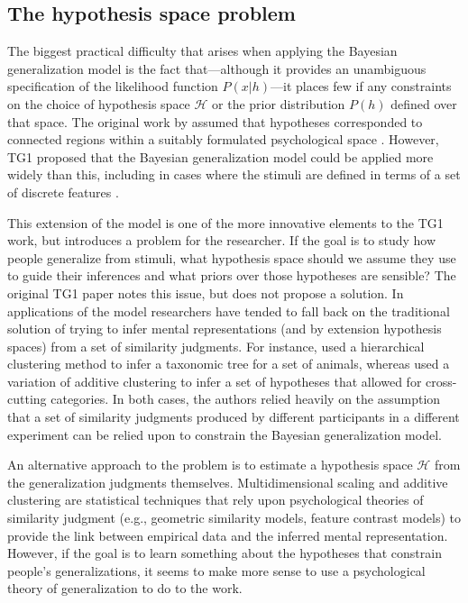 \subsection{The hypothesis space problem}

The biggest practical difficulty that arises when applying the Bayesian generalization model is the fact that---although it provides an unambiguous specification of the likelihood function $P(x|h)$---it places few if any constraints on the choice of hypothesis space $\mathcal{H}$ or the prior distribution $P(h)$ defined over that space. The original work by  assumed that hypotheses corresponded to connected regions within a suitably formulated psychological space \cite<and estimated by multidimensional scaling or similar methods:>{torgerson_theory_1958,borg_modern_2005}. However, TG1 proposed that the Bayesian generalization model could be applied more widely than this, including in cases where the stimuli are defined in terms of a set of discrete features \cite<estimated using additive clustering or similar methods: >{shepard_additive_1979,lee_generating_2002,navarro2008}.

This extension of the model is one of the more innovative elements to the TG1 work, but introduces a problem for the researcher. If the goal is to study how people generalize from stimuli, what hypothesis space should we assume they use to guide their inferences and what priors over those hypotheses are sensible? The original TG1 paper notes this issue, but does not propose a solution. In applications of the model researchers have tended to fall back on the traditional solution of trying to infer mental representations (and by extension hypothesis spaces) from a set of similarity judgments. For instance,  used a hierarchical clustering method to infer a taxonomic tree for a set of animals, whereas  used a variation of additive clustering to infer a set of hypotheses that allowed for cross-cutting categories. In both cases, the authors relied heavily on the assumption that a set of similarity judgments produced by different participants in a different experiment can be relied upon to constrain the Bayesian generalization model.

An alternative approach to the problem is to estimate a hypothesis space $\mathcal{H}$ from the generalization judgments themselves. Multidimensional scaling and additive clustering are statistical techniques that rely upon psychological theories of similarity judgment (e.g., geometric similarity models, feature contrast models) to provide the link between empirical data and the inferred mental representation. However, if the goal is to learn something about the hypotheses that constrain people's generalizations, it seems to make more sense to use a psychological theory of generalization to do to the work. 


